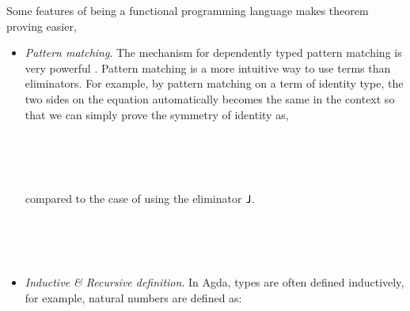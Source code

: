 Some features of being a functional programming language makes theorem proving easier,

\begin{itemize}
\item \textit{Pattern matching}. The mechanism for dependently typed pattern matching is very powerful \cite{alti:pisigma-new}. Pattern matching is a more intuitive way to use terms than eliminators. For example, by pattern matching on a term of identity type, the two sides on the equation automatically becomes the same in the context so that we can simply prove the symmetry of identity as,

\begin{code}
\\
\> \AgdaSymbol{:} \AgdaSymbol{\{} \AgdaSymbol{:} \AgdaSymbol{\}\{}  \AgdaSymbol{:} \AgdaSymbol{\}}        \<%
\\
\>  \AgdaSymbol{=} \<%
\\
\end{code}

compared to the case of using the eliminator $\operatorname{\mathsf{J}}$.

\begin{code}\label{symmetry}
\\
\> \AgdaSymbol{:} \AgdaSymbol{\{} \AgdaSymbol{:} \AgdaSymbol{\}\{}  \AgdaSymbol{:} \AgdaSymbol{\}}        \<%
\\
\> \AgdaSymbol{=}     \AgdaBound{\_}    \AgdaSymbol{)}  \AgdaBound{\_}  \AgdaSymbol{)} \AgdaSymbol{\_} \AgdaSymbol{\_}\<%
\\
\end{code}

\item \textit{Inductive \& Recursive definition}. In Agda, types are often defined inductively, for example, natural numbers are defined as:

\begin{code}\>\<%
\>  \AgdaSymbol{:}  \<%
\\
\>[0]\<[2]%
\>[2] \AgdaSymbol{:} \<%
\\
\>[0]\<[2]%
\>[2] \<[7]%
\>[7]\AgdaSymbol{:} \AgdaSymbol{(} \AgdaSymbol{:} \AgdaSymbol{)}  \<%
\>\<\end{code}


\end{itemize}
